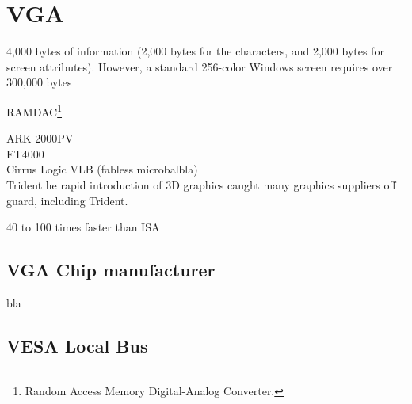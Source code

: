 \section{VGA}
 4,000 bytes of information (2,000 bytes for the characters, and 2,000 bytes for screen attributes). However, a standard 256-color Windows screen requires over 300,000 bytes\\
 \par
RAMDAC\footnote{Random Access Memory Digital-Analog Converter.}
\par
ARK 2000PV\\
ET4000\\
Cirrus Logic VLB (fabless microbalbla)\\
Trident he rapid introduction of 3D graphics caught many graphics suppliers off guard, including Trident.\\
\par
\par
40 to 100 times faster than ISA\\
\par
\subsection{VGA Chip manufacturer}

bla
\par


\subsection{VESA Local Bus}


